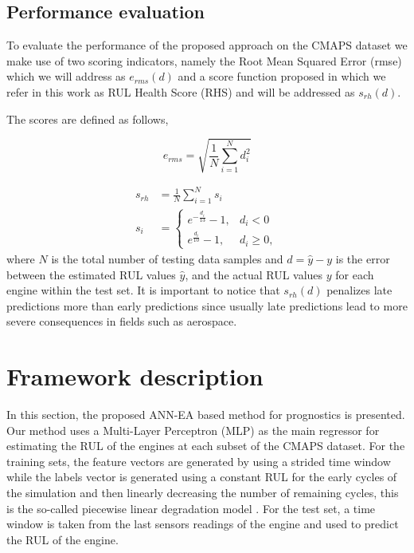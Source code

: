 \documentclass{article}
\begin{document}
\subsection{Performance evaluation}
\label{sec:rul_metrics}

To evaluate the performance of the proposed approach on the CMAPS dataset we make use of two scoring indicators, namely the Root Mean Squared Error (\gls{rmse}) which we will address as $e_{rms}(d)$ and a score function proposed in \cite{Saxena2008} which we refer in this work as RUL Health Score (RHS) and will be addressed as $s_{rh}(d)$. 

\pagebreak

The scores are defined as follows,

\begin{equation}
e_{rms} = \sqrt{ \frac{1}{N} \sum_{i=1}^{N}{d_i^2}}
\label{eq:rmse}
\end{equation}

\begin{align}
s_{rh} &= \frac{1}{N} \sum_{i=1}^{N}{s_i} \nonumber \\
s_i &= \begin{cases} 
      e^{-\frac{d_i}{13}} - 1, & d_i < 0 \\
      e^{\frac{d_i}{10}} - 1, & d_i \geq 0,
\end{cases}
\label{eq:rhs}
\end{align}
where $N$ is the total number of testing data samples and $d = \hat{y} - y$ is the error between the estimated RUL values $\hat{y}$, and the actual RUL values $y$ for each engine within the test set. It is important to notice that $s_{rh}(d)$ penalizes late predictions more than early predictions since usually late predictions lead to more severe consequences in fields such as aerospace.



\section{Framework description}
\label{sec:method}

In this section, the proposed ANN-EA based method for prognostics is presented. Our method uses a Multi-Layer Perceptron (MLP) as the main regressor for estimating the RUL of the engines at each subset of the CMAPS dataset. For the training sets, the feature vectors are generated by using a strided time window while the labels vector is generated using a constant RUL for the early cycles of the simulation and then linearly decreasing the number of remaining cycles, this is the so-called piecewise linear degradation model \cite{Ramasso2014}. For the test set, a time window is taken from the last sensors readings of the engine and used to predict the RUL of the engine.
\end{document}
